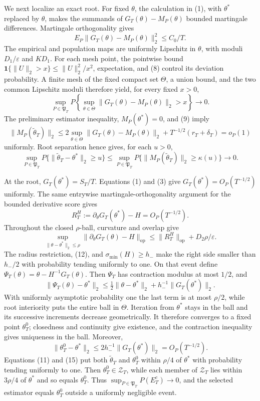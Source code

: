 We next localize an exact root. For fixed \(\theta\), the calculation in (1), with \(\theta^*\) replaced by \(\theta\), makes the summands of \(G_T(\theta)-M_P(\theta)\) bounded martingale differences. Martingale orthogonality gives
\[
 E_P\|G_T(\theta)-M_P(\theta)\|_2^2\le C_0/T.
\tag{8}
\]
The empirical and population maps are uniformly Lipschitz in \(\theta\), with moduli \(D_1/\varepsilon\) and \(KD_1\). For each mesh point, the pointwise bound \(\mathbf1\{\|U\|_2>x\}\le \|U\|_2^2/x^2\), expectation, and (8) control its deviation probability. A finite mesh of the fixed compact set \(\Theta\), a union bound, and the two common Lipschitz moduli therefore yield, for every fixed \(x>0\),
\[
 \sup_{P\in\mathfrak P_T}P\!\left\{\sup_{\theta\in\Theta}
 \|G_T(\theta)-M_P(\theta)\|_2>x\right\}\longrightarrow0.
\tag{9}
\]
The preliminary estimator inequality, \(M_P(\theta^*)=0\), and (9) imply
\[
 \|M_P(\widetilde\theta_T)\|_2
 \le2\sup_{\theta\in\Theta}\|G_T(\theta)-M_P(\theta)\|_2
 +T^{-1/2}(r_T+\delta_T)=o_P(1)
\tag{10}
\]
uniformly. Root separation hence gives, for each \(u>0\),
\[
 \sup_{P\in\mathfrak P_T}P\{\|\widetilde\theta_T-\theta^*\|_2\ge u\}
 \le\sup_{P\in\mathfrak P_T}P\{\|M_P(\widetilde\theta_T)\|_2
 \ge\kappa(u)\}\longrightarrow0.
\tag{11}
\]

At the root, \(G_T(\theta^*)=S_T/T\). Equations (1) and (3) give \(G_T(\theta^*)=O_P(T^{-1/2})\) uniformly. The same entrywise martingale-orthogonality argument for the bounded derivative score gives
\[
 R_T^H:=\partial_\theta G_T(\theta^*)-H=O_P(T^{-1/2}).
\tag{12}
\]
Throughout the closed \(\rho\)-ball, curvature and overlap give
\[
 \sup_{\|\theta-\theta^*\|_2\le\rho}
 \|\partial_\theta G_T(\theta)-H\|_{\mathrm{op}}
 \le\|R_T^H\|_{\mathrm{op}}+D_2\rho/\varepsilon.
\tag{13}
\]
The radius restriction, (12), and \(\sigma_{\min}(H)\ge h_-\) make the right side smaller than \(h_-/2\) with probability tending uniformly to one. On that event define \(\Psi_T(\theta)=\theta-H^{-1}G_T(\theta)\). Then \(\Psi_T\) has contraction modulus at most \(1/2\), and
\[
 \|\Psi_T(\theta)-\theta^*\|_2
 \le\tfrac12\|\theta-\theta^*\|_2+h_-^{-1}\|G_T(\theta^*)\|_2.
\tag{14}
\]
With uniformly asymptotic probability one the last term is at most \(\rho/2\), while root interiority puts the entire ball in \(\Theta\). Iteration from \(\theta^*\) stays in the ball and its successive increments decrease geometrically. It therefore converges to a fixed point \(\theta_T^0\); closedness and continuity give existence, and the contraction inequality gives uniqueness in the ball. Moreover,
\[
 \|\theta_T^0-\theta^*\|_2
 \le2h_-^{-1}\|G_T(\theta^*)\|_2=O_P(T^{-1/2}).
\tag{15}
\]
Equations (11) and (15) put both \(\widetilde\theta_T\) and \(\theta_T^0\) within \(\rho/4\) of \(\theta^*\) with probability tending uniformly to one. Then \(\theta_T^0\in\mathcal Z_T\), while each member of \(\mathcal Z_T\) lies within \(3\rho/4\) of \(\theta^*\) and so equals \(\theta_T^0\). Thus \(\sup_{P\in\mathfrak P_T}P(E_T^c)\to0\), and the selected estimator equals \(\theta_T^0\) outside a uniformly negligible event.

